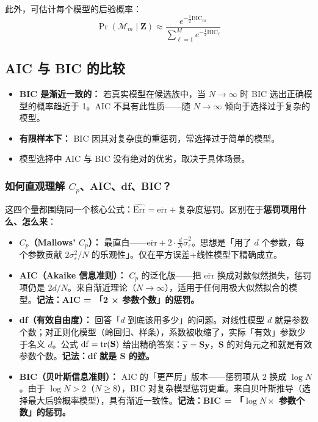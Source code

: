 此外，可估计每个模型的后验概率：
\begin{equation}\label{eq:BIC_prob}
    \Pr(\mathcal{M}_m \mid \mathbf{Z}) \approx \frac{e^{-\frac{1}{2}\mathrm{BIC}_m}}{\sum_{\ell=1}^{M} e^{-\frac{1}{2}\mathrm{BIC}_\ell}}
\end{equation}

\subsection{AIC 与 BIC 的比较}

\begin{itemize}
    \item \textbf{BIC 是渐近一致的：} 若真实模型在候选族中，当 $N \to \infty$ 时 BIC 选出正确模型的概率趋近于 1。AIC 不具有此性质——随 $N \to \infty$ 倾向于选择过于复杂的模型。
    \item \textbf{有限样本下：} BIC 因其对复杂度的重惩罚，常选择过于简单的模型。
    \item 模型选择中 AIC 与 BIC 没有绝对的优劣，取决于具体场景。
\end{itemize}

\subsubsection{如何直观理解 $C_p$、AIC、df、BIC？}

这四个量都围绕同一个核心公式：$\widehat{\mathrm{Err}} = \overline{\mathrm{err}} + \text{复杂度惩罚}$。区别在于\textbf{惩罚项用什么、怎么来}：

\begin{itemize}
    \item \textbf{$C_p$（Mallows' $C_p$）：} 最直白——$\overline{\mathrm{err}} + 2\cdot\frac{d}{N}\hat{\sigma}_\varepsilon^2$。思想是「用了 $d$ 个参数，每个参数贡献 $2\sigma_\varepsilon^2/N$ 的乐观性」。仅在平方误差+线性模型下精确成立。

    \item \textbf{AIC（Akaike 信息准则）：} $C_p$ 的泛化版——把 $\overline{\mathrm{err}}$ 换成对数似然损失，惩罚项仍是 $2d/N$。来自渐近理论（$N\to\infty$），适用于任何用极大似然拟合的模型。\textbf{记法：AIC = 「2 × 参数个数」的惩罚。}

    \item \textbf{df（有效自由度）：} 回答「$d$ 到底该用多少」的问题。对线性模型 $d$ 就是参数个数；对正则化模型（岭回归、样条），系数被收缩了，实际「有效」参数少于名义 $d$。公式 $\mathrm{df} = \operatorname{tr}(\mathbf{S})$ 给出精确答案：$\hat{\mathbf{y}} = \mathbf{S}\mathbf{y}$，$\mathbf{S}$ 的对角元之和就是有效参数个数。\textbf{记法：df 就是 $\mathbf{S}$ 的迹。}

    \item \textbf{BIC（贝叶斯信息准则）：} AIC 的「更严厉」版本——惩罚项从 $2$ 换成 $\log N$。由于 $\log N > 2$（$N \ge 8$），BIC 对复杂模型惩罚更重。来自贝叶斯推导（选择最大后验概率模型），具有渐近一致性。\textbf{记法：BIC = 「$\log N \times$ 参数个数」的惩罚。}
\end{itemize}

